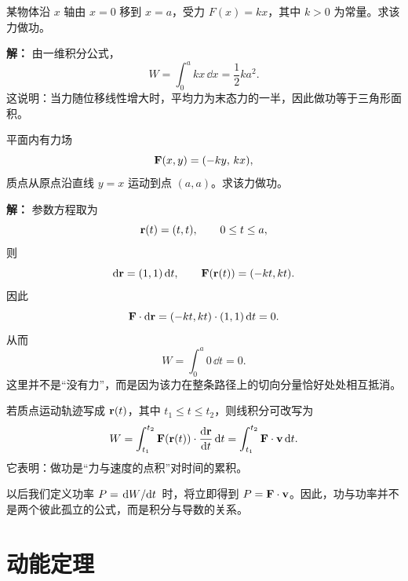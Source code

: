 \begin{example}\label{ex:linear-force-work}
某物体沿 $x$ 轴由 $x=0$ 移到 $x=a$，受力 $F(x)=kx$，其中 $k>0$ 为常量。求该力做功。

\textbf{解：}
由一维积分公式，
\[
W=\int_0^a kx\,\dd x = \frac{1}{2}ka^2.
\]
这说明：当力随位移线性增大时，平均力为末态力的一半，因此做功等于三角形面积。

\begin{center}
\end{center}
\end{example}

\begin{example}[二维路径上的线积分]
平面内有力场
\[
\vb{F}(x,y)=(-ky,\,kx),
\]
质点从原点沿直线 $y=x$ 运动到点 $(a,a)$。求该力做功。

\textbf{解：}
参数方程取为
\[
\vb{r}(t)=(t,t),\qquad 0\le t\le a,
\]
则
\[
\dd \vb{r}=(1,1)\,\dd t,
\qquad
\vb{F}(\vb{r}(t))=(-kt,kt).
\]
因此
\[
\vb{F}\cdot \dd \vb{r}=(-kt,kt)\cdot (1,1)\,\dd t = 0.
\]
从而
\[
W=\int_0^a 0\,\dd t =0.
\]
这里并不是“没有力”，而是因为该力在整条路径上的切向分量恰好处处相互抵消。
\end{example}

\begin{definition}[变力做功的微积分表述]
若质点运动轨迹写成 $\vb{r}(t)$，其中 $t_1\le t\le t_2$，则线积分可改写为
\[
W=\int_{t_1}^{t_2} \vb{F}(\vb{r}(t))\cdot \dv{\vb{r}}{t}\,\dd t
=\int_{t_1}^{t_2} \vb{F}\cdot \vb{v}\,\dd t.
\]
它表明：做功是“力与速度的点积”对时间的累积。
\end{definition}

\begin{remark}
以后我们定义功率 $P=\dv*{W}{t}$ 时，将立即得到 $P=\vb{F}\cdot \vb{v}$。因此，功与功率并不是两个彼此孤立的公式，而是积分与导数的关系。
\end{remark}

\section{动能定理}\label{sec:work-kinetic}

